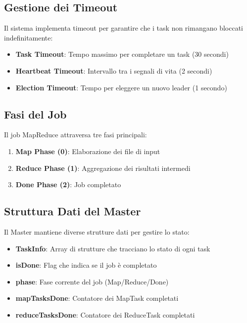 \documentclass[12pt,a4paper]{article}
\begin{document}
\subsection{Gestione dei Timeout}

Il sistema implementa timeout per garantire che i task non rimangano bloccati indefinitamente:

\begin{itemize}
\item \textbf{Task Timeout}: Tempo massimo per completare un task (30 secondi)
\item \textbf{Heartbeat Timeout}: Intervallo tra i segnali di vita (2 secondi)
\item \textbf{Election Timeout}: Tempo per eleggere un nuovo leader (1 secondo)
\end{itemize}

\subsection{Fasi del Job}

Il job MapReduce attraversa tre fasi principali:

\begin{enumerate}
\item \textbf{Map Phase (0)}: Elaborazione dei file di input
\item \textbf{Reduce Phase (1)}: Aggregazione dei risultati intermedi
\item \textbf{Done Phase (2)}: Job completato
\end{enumerate}

\subsection{Struttura Dati del Master}

Il Master mantiene diverse strutture dati per gestire lo stato:

\begin{itemize}
\item \textbf{TaskInfo}: Array di strutture che tracciano lo stato di ogni task
\item \textbf{isDone}: Flag che indica se il job è completato
\item \textbf{phase}: Fase corrente del job (Map/Reduce/Done)
\item \textbf{mapTasksDone}: Contatore dei MapTask completati
\item \textbf{reduceTasksDone}: Contatore dei ReduceTask completati
\end{itemize}
\end{document}
